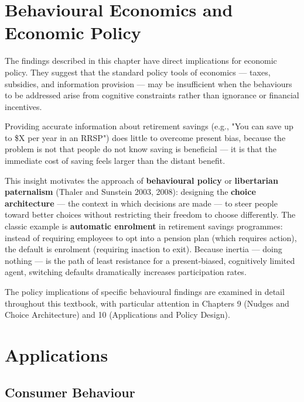 \documentclass[12pt, letterpaper]{article}
\begin{document}
\medskip


\section{Behavioural Economics and Economic Policy}


The findings described in this chapter have direct implications for economic policy. They suggest that the standard policy tools of economics --- taxes, subsidies, and information provision --- may be insufficient when the behaviours to be addressed arise from cognitive constraints rather than ignorance or financial incentives.

Providing accurate information about retirement savings (e.g., "You can save up to \$X per year in an RRSP") does little to overcome present bias, because the problem is not that people do not know saving is beneficial --- it is that the immediate cost of saving feels larger than the distant benefit.

This insight motivates the approach of \textbf{behavioural policy} or \textbf{libertarian paternalism} (Thaler and Sunstein 2003, 2008): designing the \textbf{choice architecture} --- the context in which decisions are made --- to steer people toward better choices without restricting their freedom to choose differently. The classic example is \textbf{automatic enrolment} in retirement savings programmes: instead of requiring employees to opt into a pension plan (which requires action), the default is enrolment (requiring inaction to exit). Because inertia --- doing nothing --- is the path of least resistance for a present-biased, cognitively limited agent, switching defaults dramatically increases participation rates.

The policy implications of specific behavioural findings are examined in detail throughout this textbook, with particular attention in Chapters 9 (Nudges and Choice Architecture) and 10 (Applications and Policy Design).

\medskip


\section{Applications}



\subsection{Consumer Behaviour}
\end{document}
